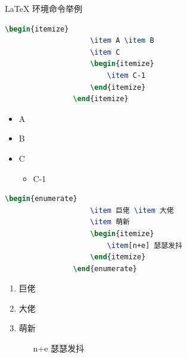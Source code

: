 \documentclass{beamer}
\begin{document}
	\begin{frame}[fragile]{\LaTeX{} 环境命令举例}
		\begin{minipage}{0.5\linewidth}
			\begin{lstlisting}[language=TeX]
				\begin{itemize}
					\item A \item B
					\item C
					\begin{itemize}
						\item C-1
					\end{itemize}
				\end{itemize}
			\end{lstlisting}
		\end{minipage}\hspace{1cm}
		\begin{minipage}{0.3\linewidth}
			\begin{itemize}
				\item A
				\item B
				\item C
				\begin{itemize}
					\item C-1
				\end{itemize}
			\end{itemize}
		\end{minipage}
		\medskip
		\pause
		\begin{minipage}{0.5\linewidth}
			\begin{lstlisting}[language=TeX]
				\begin{enumerate}
					\item 巨佬 \item 大佬
					\item 萌新
					\begin{itemize}
						\item[n+e] 瑟瑟发抖
					\end{itemize}
				\end{enumerate}
			\end{lstlisting}
		\end{minipage}\hspace{1cm}
		\begin{minipage}{0.3\linewidth}
			\begin{enumerate}
				\item 巨佬
				\item 大佬
				\item 萌新
				\begin{itemize}
					\item[n+e] 瑟瑟发抖
				\end{itemize}
			\end{enumerate}
		\end{minipage}
	\end{frame}
	
\end{document}
